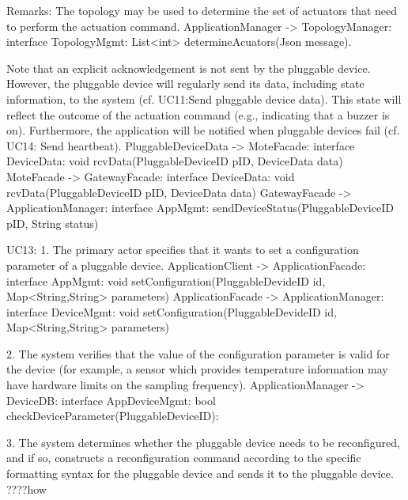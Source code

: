            Remarks:
            The topology may be used to determine the set of actuators that need 
            to perform the actuation command.
                ApplicationManager -> TopologyManager: interface TopologyMgmt:
                                                             List<int> determineAcuators(Json message).
            
            Note that an explicit acknowledgement is not sent by the pluggable device. However, 
            the pluggable device will regularly send its data, including state information, to the system 
            (cf. UC11:Send pluggable device data). This state will reflect the outcome of the actuation command
            (e.g., indicating that a buzzer is on). Furthermore, the application will be notified when
            pluggable devices fail (cf. UC14: Send heartbeat).
                PluggableDeviceData -> MoteFacade: interface DeviceData: void rcvData(PluggableDeviceID pID, DeviceData data)
                MoteFacade -> GatewayFacade: interface DeviceData: void rcvData(PluggableDeviceID pID, DeviceData data)
                GatewayFacade -> ApplicationManager: interface AppMgmt: sendDeviceStatus(PluggableDeviceID pID, String status)

                
                
        UC13: 
            1. The primary actor specifies that it wants to set a configuration parameter of a pluggable
            device.
                ApplicationClient -> ApplicationFacade: interface AppMgmt:
                                                        void setConfiguration(PluggableDevideID id, Map<String,String> parameters)
                ApplicationFacade -> ApplicationManager: interface DeviceMgmt:
                                                        void setConfiguration(PluggableDevideID id, Map<String,String> parameters)
            
                
            2. The system verifies that the value of the configuration parameter is valid for the device (for
               example, a sensor which provides temperature information may have hardware limits on the
               sampling frequency).
               ApplicationManager -> DeviceDB: interface AppDeviceMgmt: bool checkDeviceParameter(PluggableDeviceID):
                                                      
            3. The system determines whether the pluggable device needs to be reconfigured, and if so,
               constructs a reconfiguration command according to the specific formatting syntax for the
               pluggable device and sends it to the pluggable device. ????how
            
